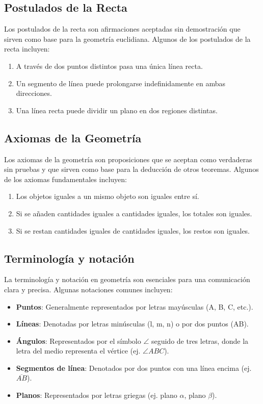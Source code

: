 \subsection{Postulados de la Recta}
Los postulados de la recta son afirmaciones aceptadas sin demostración que sirven como base para la geometría euclidiana. Algunos de los postulados de la recta incluyen:
\begin{enumerate}
    \item A través de dos puntos distintos pasa una única línea recta.
    \item Un segmento de línea puede prolongarse indefinidamente en ambas direcciones.
    \item Una línea recta puede dividir un plano en dos regiones distintas.
\end{enumerate}

\subsection{Axiomas de la Geometría}
Los axiomas de la geometría son proposiciones que se aceptan como verdaderas sin pruebas y que sirven como base para la deducción de otros teoremas. Algunos de los axiomas fundamentales incluyen:
\begin{enumerate}
    \item Los objetos iguales a un mismo objeto son iguales entre sí.
    \item Si se añaden cantidades iguales a cantidades iguales, los totales son iguales.
    \item Si se restan cantidades iguales de cantidades iguales, los restos son iguales.
\end{enumerate}

\subsection{Terminología y notación}
La terminología y notación en geometría son esenciales para una comunicación clara y precisa. Algunas notaciones comunes incluyen:
\begin{itemize}
    \item \textbf{Puntos}: Generalmente representados por letras mayúsculas (A, B, C, etc.).
    \item \textbf{Líneas}: Denotadas por letras minúsculas (l, m, n) o por dos puntos (AB).
    \item \textbf{Ángulos}: Representados por el símbolo $\angle$ seguido de tres letras, donde la letra del medio representa el vértice (ej. $\angle ABC$).
    \item \textbf{Segmentos de línea}: Denotados por dos puntos con una línea encima (ej. $\overline{AB}$).
    \item \textbf{Planos}: Representados por letras griegas (ej. plano $\alpha$, plano $\beta$).
\end{itemize}


